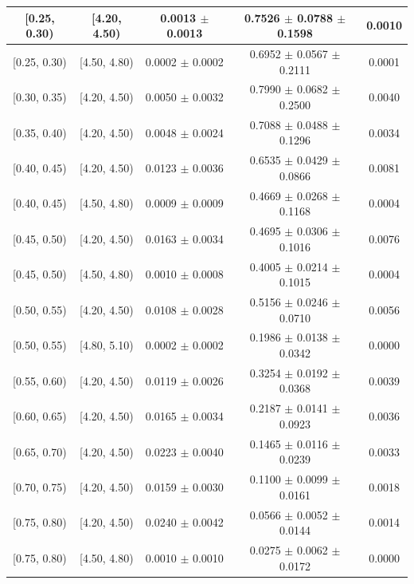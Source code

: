 \begin{longtable}{|c|c|c|c|c|}
\hline
\endlastfoot
[0.25, 0.30) & [4.20, 4.50) & 0.0013 $\pm$ 0.0013 & 0.7526 $\pm$ 0.0788 $\pm$ 0.1598 & 0.0010 \\ 
\hline
[0.25, 0.30) & [4.50, 4.80) & 0.0002 $\pm$ 0.0002 & 0.6952 $\pm$ 0.0567 $\pm$ 0.2111 & 0.0001 \\ 
\hline
[0.30, 0.35) & [4.20, 4.50) & 0.0050 $\pm$ 0.0032 & 0.7990 $\pm$ 0.0682 $\pm$ 0.2500 & 0.0040 \\ 
\hline
[0.35, 0.40) & [4.20, 4.50) & 0.0048 $\pm$ 0.0024 & 0.7088 $\pm$ 0.0488 $\pm$ 0.1296 & 0.0034 \\ 
\hline
[0.40, 0.45) & [4.20, 4.50) & 0.0123 $\pm$ 0.0036 & 0.6535 $\pm$ 0.0429 $\pm$ 0.0866 & 0.0081 \\ 
\hline
[0.40, 0.45) & [4.50, 4.80) & 0.0009 $\pm$ 0.0009 & 0.4669 $\pm$ 0.0268 $\pm$ 0.1168 & 0.0004 \\ 
\hline
[0.45, 0.50) & [4.20, 4.50) & 0.0163 $\pm$ 0.0034 & 0.4695 $\pm$ 0.0306 $\pm$ 0.1016 & 0.0076 \\ 
\hline
[0.45, 0.50) & [4.50, 4.80) & 0.0010 $\pm$ 0.0008 & 0.4005 $\pm$ 0.0214 $\pm$ 0.1015 & 0.0004 \\ 
\hline
[0.50, 0.55) & [4.20, 4.50) & 0.0108 $\pm$ 0.0028 & 0.5156 $\pm$ 0.0246 $\pm$ 0.0710 & 0.0056 \\ 
\hline
[0.50, 0.55) & [4.80, 5.10) & 0.0002 $\pm$ 0.0002 & 0.1986 $\pm$ 0.0138 $\pm$ 0.0342 & 0.0000 \\ 
\hline
[0.55, 0.60) & [4.20, 4.50) & 0.0119 $\pm$ 0.0026 & 0.3254 $\pm$ 0.0192 $\pm$ 0.0368 & 0.0039 \\ 
\hline
[0.60, 0.65) & [4.20, 4.50) & 0.0165 $\pm$ 0.0034 & 0.2187 $\pm$ 0.0141 $\pm$ 0.0923 & 0.0036 \\ 
\hline
[0.65, 0.70) & [4.20, 4.50) & 0.0223 $\pm$ 0.0040 & 0.1465 $\pm$ 0.0116 $\pm$ 0.0239 & 0.0033 \\ 
\hline
[0.70, 0.75) & [4.20, 4.50) & 0.0159 $\pm$ 0.0030 & 0.1100 $\pm$ 0.0099 $\pm$ 0.0161 & 0.0018 \\ 
\hline
[0.75, 0.80) & [4.20, 4.50) & 0.0240 $\pm$ 0.0042 & 0.0566 $\pm$ 0.0052 $\pm$ 0.0144 & 0.0014 \\ 
\hline
[0.75, 0.80) & [4.50, 4.80) & 0.0010 $\pm$ 0.0010 & 0.0275 $\pm$ 0.0062 $\pm$ 0.0172 & 0.0000 \\ 
\hline
\end{longtable}
